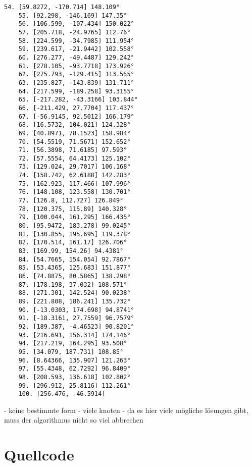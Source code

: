 \documentclass[a4paper,10pt,ngerman]{scrartcl}
\begin{document}
\begin{lstlisting}[frame=single, title=Programmausgabe wenigerkrumm7.txt, breaklines=true,label={lst:lstlisting4}]
    54. [59.8272, -170.714] 148.109°
    55. [92.298, -146.169] 147.35°
    56. [106.599, -107.434] 150.022°
    57. [205.718, -24.9765] 112.76°
    58. [224.599, -34.7985] 111.954°
    59. [239.617, -21.9442] 102.558°
    60. [276.277, -49.4487] 129.242°
    61. [278.105, -93.7718] 173.926°
    62. [275.793, -129.415] 113.555°
    63. [235.827, -143.839] 131.711°
    64. [217.599, -189.258] 93.3155°
    65. [-217.282, -43.3166] 103.844°
    66. [-211.429, 27.7704] 117.437°
    67. [-56.9145, 92.5012] 166.179°
    68. [16.5732, 104.021] 124.328°
    69. [40.8971, 78.1523] 158.984°
    70. [54.5519, 71.5671] 152.652°
    71. [56.3898, 71.6185] 97.593°
    72. [57.5554, 64.4173] 125.102°
    73. [129.024, 29.7017] 106.168°
    74. [158.742, 62.6188] 142.283°
    75. [162.923, 117.466] 107.996°
    76. [148.108, 123.558] 130.701°
    77. [126.8, 112.727] 126.849°
    78. [120.375, 115.89] 140.328°
    79. [100.044, 161.295] 166.435°
    80. [95.9472, 183.278] 99.0245°
    81. [130.855, 195.695] 119.378°
    82. [170.514, 161.17] 126.706°
    83. [169.99, 154.26] 94.4381°
    84. [54.7665, 154.054] 92.7867°
    85. [53.4365, 125.683] 151.877°
    86. [74.8875, 80.5865] 138.298°
    87. [178.198, 37.032] 108.571°
    88. [271.301, 142.524] 90.0238°
    89. [221.808, 186.241] 135.732°
    90. [-13.0303, 174.698] 94.8741°
    91. [-18.3161, 27.7559] 96.7579°
    92. [189.387, -4.46523] 90.8201°
    93. [216.691, 156.314] 174.146°
    94. [217.219, 164.295] 93.508°
    95. [34.079, 187.731] 108.85°
    96. [8.64366, 135.907] 121.263°
    97. [55.4348, 62.7292] 96.8409°
    98. [208.593, 136.618] 102.802°
    99. [296.912, 25.8116] 112.261°
    100. [256.476, -46.5914]
    \end{lstlisting}

    - keine bestimmte form
    - viele knoten
    - da es hier viele mögliche lösungen gibt, muss der algorithmus nicht so viel abbrechen
    
    \newpage
    \section{Quellcode}
    \label{sec:quellcode}
    \label{LastPage}
\end{document}
